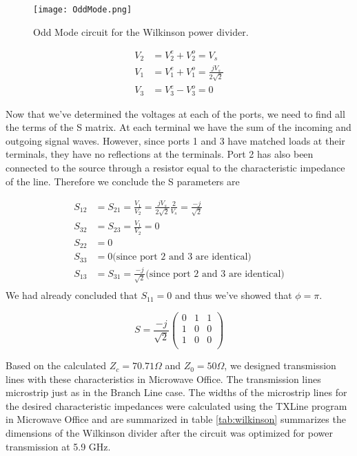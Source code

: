 \documentclass[twocolumn, aps, apl]{revtex4-1}
\begin{document}
\begin{figure}[!htbp]
    \centering
    \texttt{[image: OddMode.png]}
    \caption{Odd Mode circuit for the Wilkinson power divider. }
    \label{fig:oddmode}
\end{figure}

\begin{align*}
    V_2 &= V_2^e + V_2^o = V_s \\
    V_1 &= V_1^e + V_1^o = \frac{j V_s}{2 \sqrt{2}} \\
    V_3 &= V_3^e - V_3^o = 0
\end{align*}

Now that we've determined the voltages at each of the ports, we need to find all the terms of the S matrix. At each terminal we have the sum of the incoming and outgoing signal waves. However, since ports 1 and 3 have matched loads at their terminals, they have no reflections at the terminals. Port 2 has also been connected to the source through a resistor equal to the characteristic impedance of the line. Therefore we conclude the S parameters are

\begin{align*}
    S_{12} &= S_{21} = \frac{V_1}{V_2} = \frac{j V_s}{2 \sqrt{2}} \frac{2}{V_s} = \frac{-j}{\sqrt{2}} \\ 
    S_{32} &= S_{23} = \frac{V_1}{V_2} = 0 \\
    S_{22} &= 0 \\
    S_{33} &= 0 \textrm{(since port 2 and 3 are identical)}\\ 
    S_{13} &= S_{31} = \frac{-j}{\sqrt{2}} \textrm{(since port 2 and 3 are identical)}\\ 
\end{align*}
We had already concluded that $S_{11} = 0$ and thus we've showed that $\phi = \pi$.

\begin{equation}
S = \frac{-j}{\sqrt{2}}
\begin{pmatrix}
    0 & 1 & 1 \\
    1 & 0 & 0 \\
    1 & 0 & 0 \\
\end{pmatrix}
\end{equation}

Based on the calculated $Z_c = 70.71 \Omega$ and $Z_0 = 50 \Omega$, we designed transmission lines with these characteristics in Microwave Office. The transmission lines microstrip just as in the Branch Line case. The widths of the microstrip lines for the desired characteristic impedances were calculated using the TXLine program in Microwave Office and are summarized in table \ref{tab:wilkinson} summarizes the dimensions of the Wilkinson divider after the circuit was optimized for power transmission at 5.9 GHz. 
\end{document}
